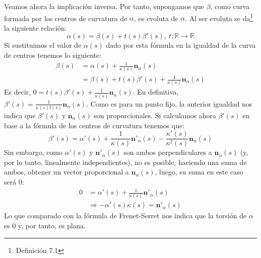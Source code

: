 Veamos ahora la implicación inversa. Por tanto, supongamos que $\beta$, como curva formada por los centros de curvatura de $\alpha$, es
evoluta de $\alpha$. Al ser evoluta se da\footnote{Definición 7.1\cite{sanjurjo}} la siguiente relación:
\[
\alpha\left( s \right) = \beta\left( s \right) + t\left( s \right)
\beta'\left( s \right),\ t: \mathbb{R} \rightarrow \mathbb{R}
\]
Si sustituimos el valor de $\alpha\left( s \right)$ dado por esta fórmula en la
igualdad de la curva de centros tenemos lo siguiente:
\begin{align*}
    \beta\left( s \right) &= \alpha\left( s \right) + \frac{1}{\kappa\left( s
    \right)} \mathbf{n}_{\alpha}\left( s \right)\\
    &= \beta\left( s \right) + t\left( s \right) \beta'\left( s
    \right) + \frac{1}{\kappa\left( s \right)} \mathbf{n}_{\alpha}\left( s \right)
\end{align*}
Es decir, $0 = t\left( s \right)\beta'\left( s \right) +
\frac{1}{\kappa\left( s \right)} \mathbf{n}_{\alpha}\left( s \right)$. En
definitiva, $\beta'\left( s \right) = \frac{1}{\kappa\left( s \right)
t\left( s \right)} \mathbf{n}_{\alpha}\left( s \right)$. Como es para
un punto fijo, la anterior igualdad nos indica que $\beta'\left( s \right)$ y
$\mathbf{n}_{\alpha}\left( s \right)$ son proporcionales. %
Si calculamos ahora $\beta'\left( s \right)$ en base a la fórmula de los centros de curvatura
tenemos que:
\[
\beta'\left( s \right) = \alpha'\left( s \right) + \frac{1}{\kappa\left( s
\right)} \mathbf{n}'_{\alpha}\left( s \right) - \frac{\kappa'\left( s
\right)}{\kappa^2\left( s \right)} \mathbf{n}_{\alpha}\left( s \right)
\]
Sin embargo, como $\alpha'\left( s \right)$ y $\mathbf{n}'_{\alpha}\left( s
\right)$ son ambos perpendiculares a $\mathbf{n}_{\alpha}\left( s \right)$ (y,
por lo tanto, linealmente independientes), no es posible, haciendo una suma de
ambos, obtener un vector proporcional a $\mathbf{n}_{\alpha}\left( s \right)$,
luego, su suma en este caso será $0$:
\begin{align*}
    0 &= \alpha'\left( s \right) + \frac{1}{\kappa\left( s
\right)}\mathbf{n}'_{\alpha}\left( s \right)\\
      &\Rightarrow -\alpha'\left( s \right) \kappa\left( s \right) =
      \mathbf{n}'_{\alpha}\left( s \right)
\end{align*}
Lo que comparado con la fórmula de Frenet-Serret nos indica que la torsión de
$\alpha$ es $0$ y, por tanto, es plana.

